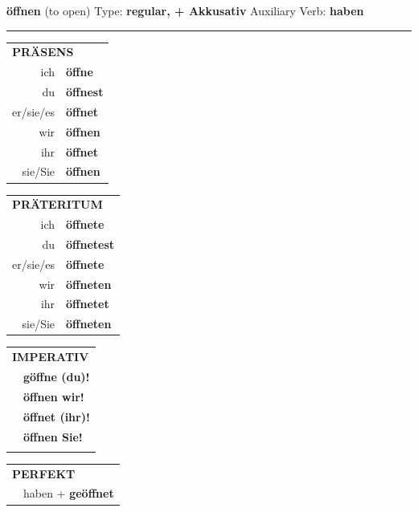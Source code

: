 \documentclass[10pt,a4paper]{revtex4-2}
\begin{document}
\begin{verbbox-acc}
    {\Large \bf öffnen} (to open) \hfill Type: \textbf{regular, + Akkusativ} \hfill Auxiliary Verb: \textbf{haben} 
    
     \vspace{5pt}

    \hrule
    
    \vspace{5pt}

  \begin{tabular}{rl}
     \multicolumn{2}{l}{\textbf{PRÄSENS} }\\
    ich & \textbf{öffne}\\
    du & \textbf{öffnest}\\
    er/sie/es & \textbf{öffnet}\\
    wir & \textbf{öffnen}\\
    ihr & \textbf{öffnet}\\
    sie/Sie & \textbf{öffnen}\\
  \end{tabular}
  \hfill
     \begin{tabular}{rl}
    \multicolumn{2}{l}{\textbf{PRÄTERITUM} }\\
    ich & \textbf{öffnete}\\
    du & \textbf{öffnetest}\\
    er/sie/es & \textbf{öffnete}\\
    wir & \textbf{öffneten}\\
    ihr & \textbf{öffnetet}\\
    sie/Sie & \textbf{öffneten}\\
  \end{tabular}
  \hfill
  \begin{tabular}{rl}
     \multicolumn{2}{l}{\textbf{IMPERATIV} }\\
   & \textbf{göffne (du)!}\\
   & \textbf{öffnen wir!}\\
   & \textbf{öffnet (ihr)!}\\
   & \textbf{öffnen Sie!}\\
   & \vspace{10pt}
  \end{tabular}

    \vspace{10pt}

 \begin{tabular}{rl}
     \multicolumn{2}{l}{\textbf{PERFEKT}}\\
   & haben + \textbf{geöffnet}\\
  \end{tabular}
\hfill
   \begin{tabular}{rl}
   

\end{tabular}
\end{verbbox-acc}
\end{document}
